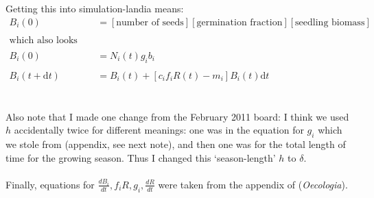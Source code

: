 \documentclass[11pt,a4paper,oneside]{article}
\begin{document}
\noindent Getting this into simulation-landia means:
\begin{align*}
B_{i}(0) & = [\text{number of seeds}][\text{germination
  fraction}][\text{seedling biomass}]
\\
\\
\text{which also looks like:}
\\
\\
B_{i}(0) & = N_{i}(t) g_{i}b_{i}
\\
\\
B_{i}(t+\mathrm{d}t) & =B_{i}(t)+[c_{i}f_{i}R(t)-m_{i}]B_{i}(t)\mathrm{d}t
\end{align*}
\\
\\
\noindent Also note that I made one change from the February 2011 board: I think we
used \(h\) accidentally twice for different meanings: one was in the
equation for \(g_{i}\) which we stole from \cite{Chesson:2004eo}
(appendix, see next note), and then one was for the total length of time for the
growing season. Thus I changed this `season-length' \(h\) to
\(\delta\).
\\
\\
\noindent Finally, equations for \(\frac{dB_{i}}{dt}, f_{i}R, g_{i},
\frac{dR}{dt}\) were taken from the appendix of \cite{Chesson:2004eo} (\emph{Oecologia}).
\end{document}

